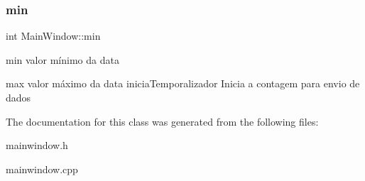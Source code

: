 \subsubsection{\texorpdfstring{min}{min}}
{\footnotesize\ttfamily int Main\+Window\+::min}



min valor mínimo da data 

max valor máximo da data inicia\+Temporalizador Inicia a contagem para envio de dados 

The documentation for this class was generated from the following files\+:\begin{DoxyCompactItemize}
\item 
mainwindow.\+h\item 
mainwindow.\+cpp\end{DoxyCompactItemize}
